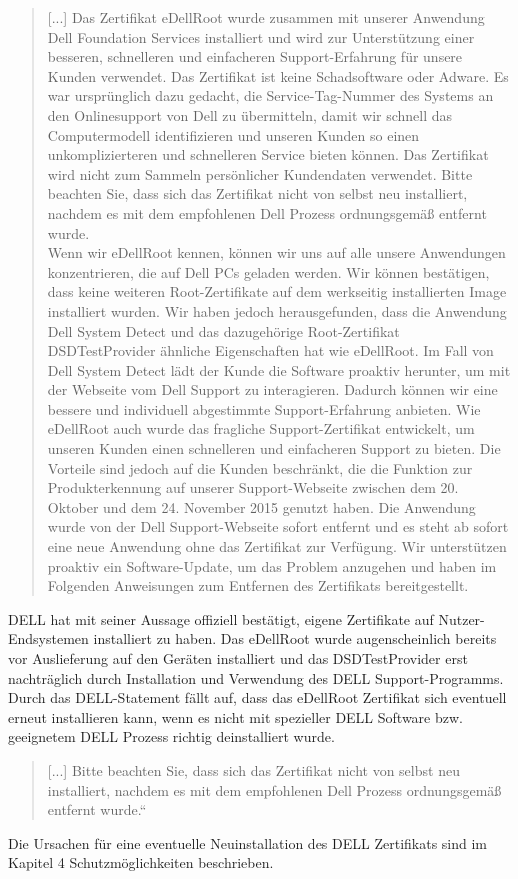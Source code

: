 \begin{quote}
	[...] Das Zertifikat eDellRoot wurde zusammen mit unserer Anwendung Dell Foundation Services installiert und wird zur Unterstützung einer besseren, schnelleren und einfacheren Support-Erfahrung für unsere Kunden verwendet. Das Zertifikat ist keine Schadsoftware oder Adware. Es war ursprünglich dazu gedacht, die Service-Tag-Nummer des Systems an den Onlinesupport von Dell zu übermitteln, damit wir schnell das Computermodell identifizieren und unseren Kunden so einen unkomplizierteren und schnelleren Service bieten können. Das Zertifikat wird nicht zum Sammeln persönlicher Kundendaten verwendet. Bitte beachten Sie, dass sich das Zertifikat nicht von selbst neu installiert, nachdem es mit dem empfohlenen Dell Prozess ordnungsgemäß entfernt wurde.\\
	Wenn wir eDellRoot kennen, können wir uns auf alle unsere Anwendungen konzentrieren, die auf Dell PCs geladen werden. Wir können bestätigen, dass keine weiteren Root-Zertifikate auf dem werkseitig installierten Image installiert wurden. Wir haben jedoch herausgefunden, dass die Anwendung Dell System Detect  und das dazugehörige Root-Zertifikat DSDTestProvider ähnliche Eigenschaften hat wie eDellRoot. Im Fall von Dell System Detect lädt der Kunde die Software proaktiv herunter, um mit der Webseite vom Dell Support zu interagieren. Dadurch können wir eine bessere und individuell abgestimmte Support-Erfahrung anbieten. Wie eDellRoot auch wurde das fragliche Support-Zertifikat entwickelt, um unseren Kunden einen schnelleren und einfacheren Support zu bieten. Die Vorteile sind jedoch auf die Kunden beschränkt, die die Funktion zur Produkterkennung auf unserer Support-Webseite zwischen dem 20. Oktober und dem 24. November 2015 genutzt haben. Die Anwendung wurde von der Dell Support-Webseite sofort entfernt und es steht ab sofort eine neue Anwendung ohne das Zertifikat zur Verfügung. Wir unterstützen proaktiv ein Software-Update, um das Problem anzugehen und haben im Folgenden Anweisungen zum Entfernen des Zertifikats bereitgestellt.\cite{dell}
\end{quote}
DELL hat mit seiner Aussage offiziell bestätigt, eigene Zertifikate auf Nutzer-Endsystemen installiert zu haben. Das eDellRoot wurde augenscheinlich bereits vor Auslieferung auf den Geräten installiert und das DSDTestProvider erst nachträglich durch Installation und Verwendung des DELL Support-Programms. Durch das DELL-Statement fällt auf, dass das eDellRoot Zertifikat sich eventuell erneut installieren kann, wenn es nicht mit spezieller DELL Software bzw. geeignetem DELL Prozess richtig deinstalliert wurde. 
\begin{quote}
	[...] Bitte beachten Sie, dass sich das Zertifikat nicht von selbst neu installiert, nachdem es mit dem empfohlenen Dell Prozess ordnungsgemäß entfernt wurde.“\cite{dell}
\end{quote}
Die Ursachen für eine eventuelle Neuinstallation des DELL Zertifikats sind im Kapitel 4 Schutzmöglichkeiten beschrieben.